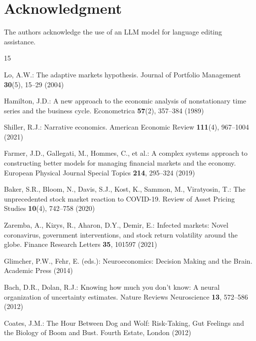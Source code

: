 \documentclass[runningheads,10pt]{llncs}
\begin{document}
\vspace{-15pt}
\section*{Acknowledgment}
\vspace{-10pt}
The authors acknowledge the use of an LLM model for language editing assistance.

\vspace{-15pt}
\begin{thebibliography}{15}

Lo, A.W.: The adaptive markets hypothesis. Journal of Portfolio Management \textbf{30}(5), 15--29 (2004)

Hamilton, J.D.: A new approach to the economic analysis of nonstationary time series and the business cycle. Econometrica \textbf{57}(2), 357--384 (1989)

Shiller, R.J.: Narrative economics. American Economic Review \textbf{111}(4), 967--1004 (2021)

Farmer, J.D., Gallegati, M., Hommes, C., et al.: A complex systems approach to constructing better models for managing financial markets and the economy. European Physical Journal Special Topics \textbf{214}, 295--324 (2019)

Baker, S.R., Bloom, N., Davis, S.J., Kost, K., Sammon, M., Viratyosin, T.: The unprecedented stock market reaction to COVID-19. Review of Asset Pricing Studies \textbf{10}(4), 742--758 (2020)

Zaremba, A., Kizys, R., Aharon, D.Y., Demir, E.: Infected markets: Novel coronavirus, government interventions, and stock return volatility around the globe. Finance Research Letters \textbf{35}, 101597 (2021)

Glimcher, P.W., Fehr, E. (eds.): Neuroeconomics: Decision Making and the Brain. Academic Press (2014)

Bach, D.R., Dolan, R.J.: Knowing how much you don't know: A neural organization of uncertainty estimates. Nature Reviews Neuroscience \textbf{13}, 572--586 (2012)

Coates, J.M.: The Hour Between Dog and Wolf: Risk-Taking, Gut Feelings and the Biology of Boom and Bust. Fourth Estate, London (2012)


\end{thebibliography}
\end{document}
